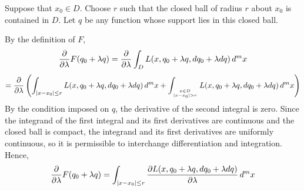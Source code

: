 \documentclass[12pt]{article}
\begin{document}
Suppose that $x_0 \in D$.  Choose $r$ such that the closed ball of radius $r$ about $x_0$ is contained in $D$.  Let $q$ be any function whose support lies in this closed ball.

By the definition of $F$,
 $${\partial \over \partial \lambda} F (q_0 + \lambda q) = {\partial \over \partial \lambda} \int_D L (x, q_0 + \lambda q, dq_0 + \lambda dq) \, d^m x$$
$$= {\partial \over \partial \lambda} \left( \int_{|x - x_0| \le r} L (x, q_0 + \lambda q, dq_0 + \lambda dq) \, d^m x + \int_{x \in D \atop |x - x_0| > r} L (x, q_0 + \lambda q, dq_0 + \lambda dq) \, d^m x \right)$$
By the condition imposed on $q$, the derivative of the second integral is zero.  Since the integrand of the first integral and its first derivatives are continuous and the closed ball is compact, the integrand and its first derivatives are uniformly continuous, so it is permissible to interchange differentiation and integration.  Hence,
 $${\partial \over \partial \lambda} F (q_0 + \lambda q) = \int_{|x - x_0| \le r} {\partial L (x, q_0 + \lambda q, dq_0 + \lambda dq) \over \partial \lambda} \, d^m x$$
\end{document}
